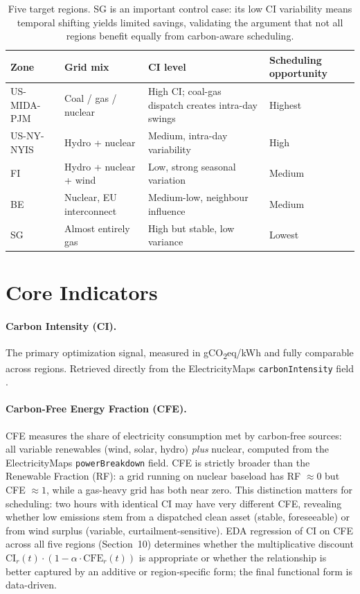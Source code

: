 \documentclass[11pt, a4paper]{article}
\begin{document}
\begin{table}[h]
\centering\small
\renewcommand{\arraystretch}{1.3}
\begin{tabularx}{\linewidth}{p{2.9cm}p{3.8cm}p{3.0cm}X}
\toprule
\textbf{Zone} & \textbf{Grid mix} & \textbf{CI level} & \textbf{Scheduling opportunity} \\
\midrule
US-MIDA-PJM & Coal / gas / nuclear & High CI; coal-gas dispatch creates intra-day swings & Highest \\
US-NY-NYIS  & Hydro + nuclear      & Medium, intra-day variability & High \\
FI          & Hydro + nuclear + wind & Low, strong seasonal variation & Medium \\
BE          & Nuclear, EU interconnect & Medium-low, neighbour influence & Medium \\
SG          & Almost entirely gas  & High but stable, low variance & Lowest \\
\bottomrule
\end{tabularx}
\caption{Five target regions. SG is an important control case: its low CI variability
means temporal shifting yields limited savings, validating the argument that not all
regions benefit equally from carbon-aware scheduling.}
\end{table}

\section{Core Indicators}

\paragraph{Carbon Intensity (CI).}
The primary optimization signal, measured in gCO\textsubscript{2}eq/kWh and fully comparable across regions. Retrieved directly from the ElectricityMaps \texttt{carbonIntensity} field \citep{radovanovic2023}.

\paragraph{Carbon-Free Energy Fraction (CFE).}
CFE measures the share of electricity consumption met by carbon-free sources: all variable renewables (wind, solar, hydro) \emph{plus} nuclear, computed from the ElectricityMaps \texttt{powerBreakdown} field. CFE is strictly broader than the Renewable Fraction (RF): a grid running on nuclear baseload has RF $\approx 0$ but CFE $\approx 1$, while a gas-heavy grid has both near zero. This distinction matters for scheduling: two hours with identical CI may have very different CFE, revealing whether low emissions stem from a dispatched clean asset (stable, foreseeable) or from wind surplus (variable, curtailment-sensitive). EDA regression of CI on CFE across all five regions (Section~10) determines whether the multiplicative discount $\mathrm{CI}_r(t)\cdot(1-\alpha\cdot\mathrm{CFE}_r(t))$ is appropriate or whether the relationship is better captured by an additive or region-specific form; the final functional form is data-driven.
\end{document}
